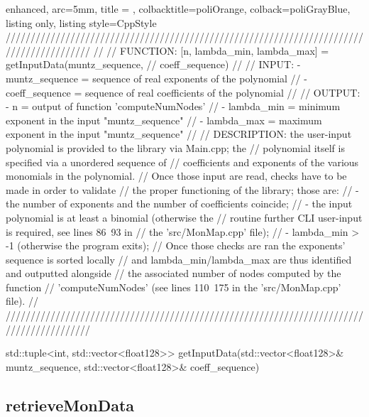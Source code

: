\documentclass[a4paper, twosided]{book}
\begin{document}
\begin{tcblisting}{enhanced,
                   arc=5mm,
                   title = \color{black}{\large \ttfamily DatIo.cpp/getInputData},
                   colbacktitle=poliOrange,
                   colback=poliGrayBlue,
                   listing only,
                   listing style=CppStyle}
/////////////////////////////////////////////////////////////////////////////////////////
//
//       FUNCTION: [n, {lambda_min, lambda_max}] = getInputData(muntz_sequence, 
//                                                              coeff_sequence)
//                
//        INPUT: - muntz_sequence = sequence of real exponents of the polynomial
//               - coeff_sequence = sequence of real coefficients of the polynomial
//
//       OUTPUT: - n = output of function 'computeNumNodes'
//               - lambda_min = minimum exponent in the input "muntz_sequence"
//               - lambda_max = maximum exponent in the input "muntz_sequence"
//
//    DESCRIPTION: the user-input polynomial is provided to the library via Main.cpp; the
//                 polynomial itself is specified via a unordered sequence of 
//                 coefficients and exponents of the various monomials in the polynomial.
//                 Once those input are read, checks have to be made in order to validate
//                 the proper functioning of the library; those are:
//                    - the number of exponents and the number of coefficients coincide;
//                    - the input polynomial is at least a binomial (otherwise the 
//                      routine further CLI user-input is required, see lines 86~93 in
//                      the 'src/MonMap.cpp' file); 
//                    - lambda_min > -1 (otherwise the program exits);
//                 Once those checks are ran the exponents' sequence is sorted locally
//                 and lambda_min/lambda_max are thus identified and outputted alongside
//                 the associated number of nodes computed by the function 
//                 'computeNumNodes' (see lines 110~175 in the 'src/MonMap.cpp' file).
//
/////////////////////////////////////////////////////////////////////////////////////////

std::tuple<int, std::vector<float128>> getInputData(std::vector<float128>& muntz_sequence, std::vector<float128>& coeff_sequence)
\end{tcblisting}

\newpage
\subsection[retrieveMonData]{\changefont retrieveMonData}\label{SubSec4.2.3}
\end{document}
